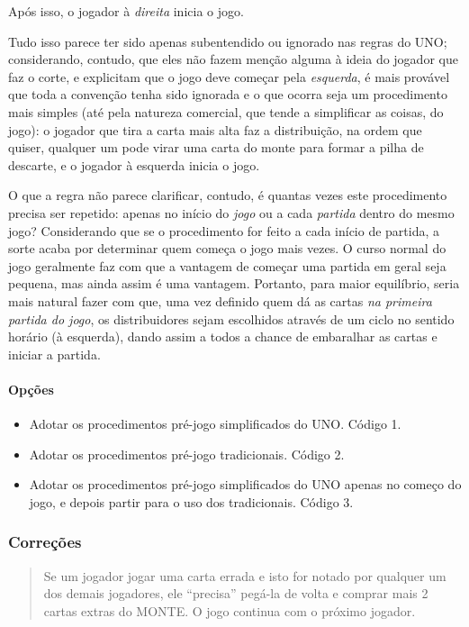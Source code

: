 Após isso, o jogador à \textit{direita} inicia o jogo.

Tudo isso parece ter sido apenas subentendido ou ignorado nas regras do UNO; considerando, contudo, que eles não fazem menção alguma à ideia do jogador que faz o corte, e explicitam que o jogo deve começar pela \textit{esquerda}, é mais provável que toda a convenção tenha sido ignorada e o que ocorra seja um procedimento mais simples (até pela natureza comercial, que tende a simplificar as coisas, do jogo): o jogador que tira a carta mais alta faz a distribuição, na ordem que quiser, qualquer um pode virar uma carta do monte para formar a pilha de descarte, e o jogador à esquerda inicia o jogo.

O que a regra não parece clarificar, contudo, é quantas vezes este procedimento precisa ser repetido: apenas no início do \textit{jogo} ou a cada \textit{partida} dentro do mesmo jogo? Considerando que se o procedimento for feito a cada início de partida, a sorte acaba por determinar quem começa o jogo mais vezes. O curso normal do jogo geralmente faz com que a vantagem de começar uma partida em geral seja pequena, mas ainda assim é uma vantagem. Portanto, para maior equilíbrio, seria mais natural fazer com que, uma vez definido quem dá as cartas \textit{na primeira partida do jogo}, os distribuidores sejam escolhidos através de um ciclo no sentido horário (à esquerda), dando assim a todos a chance de embaralhar as cartas e iniciar a partida.

\paragraph{Opções}

\begin{itemize}
\item{Adotar os procedimentos pré-jogo simplificados do UNO. Código 1.}
\item{Adotar os procedimentos pré-jogo tradicionais. Código 2.}
\item{Adotar os procedimentos pré-jogo simplificados do UNO apenas no começo do jogo, e depois partir para o uso dos tradicionais. Código 3.}
\end{itemize}

\subsubsection{Correções}

\begin{quote}
Se um jogador jogar uma carta errada e isto for notado por qualquer um dos demais jogadores, ele ``precisa'' pegá-la de volta e comprar mais 2 cartas extras do MONTE. O jogo continua com o próximo jogador.
\end{quote}

